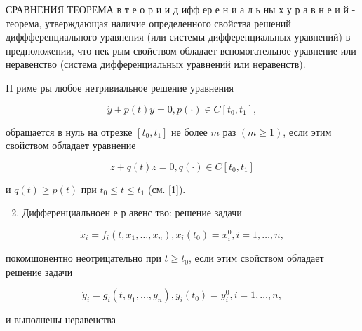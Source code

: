 \documentclass[10pt]{article}
\begin{document}
СРАВНЕНИЯ ТЕОРЕМА в т е о р и и д ифф ер е н и а л ь ны х у р а в н е и й - теорема, утверждающая наличие определенного свойства решений диффференциального уравнения (или системы дифференциальных уравнений) в предположении, что нек-рым свойством обладает вспомогательное уравнение или неравенство (система дифференциальных уравнений или неравенств).



II риме ры любое нетривиальное решение уравнения



\[

\ddot{y}+p(t) y=0, p(\cdot) \in C\left[t_{0}, t_{1}\right],

\]



обращается в нуль на отрезке $\left[t_{0}, t_{1}\right]$ не более $m$ раз $(m \geqslant 1)$, если этим свойством обладает уравнение



\[

\ddot{z}+q(t) z=0, q(\cdot) \in C\left[t_{0}, t_{1}\right]

\]



и $q(t) \geqslant p(t)$ при $t_{0} \leqslant t \leqslant t_{1}$ (см. [1]).



\begin{enumerate}

  \setcounter{enumi}{1}

  \item Дифференциальноен е р авенс тво: решение задачи

\end{enumerate}



\[

\dot{x}_{i}=f_{i}\left(t, x_{1}, \ldots, x_{n}\right), x_{i}\left(t_{0}\right)=x_{i}^{0}, i=1, \ldots, n,

\]



покомшонентно неотрицательно при $t \geqslant t_{0}$, если этим свойством обладает решение задачи



\[

\dot{y}_{i}=g_{i}\left(t, y_{1}, \ldots, y_{n}\right), y_{i}\left(t_{0}\right)=y_{i}^{0}, i=1, \ldots, n,

\]



и выполнены неравенства
\end{document}
